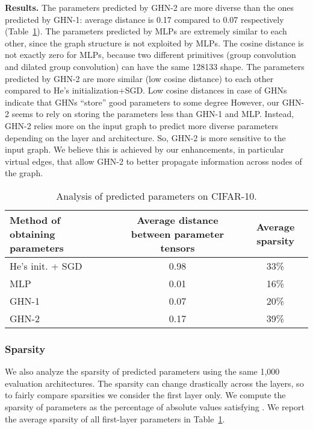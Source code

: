 \textbf{Results.} The parameters predicted by GHN-2 are more diverse than the ones predicted by GHN-1: average distance is 0.17 compared to 0.07 respectively (Table~\ref{tab:sensitivity_sparsity}). The parameters predicted by MLPs are extremely similar to each other, since the graph structure is not exploited by MLPs. The cosine distance is not exactly zero for MLPs, because two different primitives (group convolution and dilated group convolution) can have the same 128133 shape. The parameters predicted by GHN-2 are more similar (low cosine distance) to each other compared to He’s initialization+SGD. Low cosine distances in case of GHNs indicate that GHNs ``store'' good parameters to some degree However, our GHN-2 seems to rely on storing the parameters less than GHN-1 and MLP. Instead, GHN-2 relies more on the input graph to predict more diverse parameters depending on the layer and architecture. So, GHN-2 is more sensitive to the input graph. We believe this is achieved by our enhancements, in particular virtual edges, that allow GHN-2 to better propagate information across nodes of the graph.

\begin{table}[tbhp]
	\caption{Analysis of predicted parameters on CIFAR-10.}
	\label{tab:sensitivity_sparsity}
	\vspace{3pt}
	\small
	\centering
	\begin{tabular}{lcc}
		\toprule
		\textbf{Method of obtaining parameters} & \textbf{Average distance between parameter tensors} &	\textbf{Average sparsity} \\
		\midrule
		He’s init. + SGD &	0.98 & 33\% \\
		MLP	& 0.01	& 16\%\Tstrut\\
		GHN-1 & 0.07 & 20\% \\
		GHN-2 &	0.17 & 39\% \\
		\bottomrule
	\end{tabular}
\end{table}

\subsubsection{Sparsity}

We also analyze the sparsity of predicted parameters using the same 1,000 evaluation architectures. The sparsity can change drastically across the layers, so to fairly compare sparsities we consider the first layer only. We compute the sparsity of parameters  as the percentage of absolute values satisfying . We report the average sparsity of all first-layer parameters in Table~\ref{tab:sensitivity_sparsity}.


